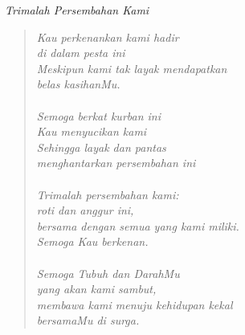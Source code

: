\small
\begin{center}
	\itshape{Trimalah Persembahan Kami}
\end{center}
\begin{verse}
	\itshape{
Kau perkenankan kami hadir\\
di dalam pesta ini\\
Meskipun kami tak layak mendapatkan\\
 belas kasihanMu.\\
{~}\\
Semoga berkat kurban ini\\
 Kau menyucikan kami\\
Sehingga layak dan pantas\\
menghantarkan persembahan ini\\
{~}\\
Trimalah persembahan kami:\\ 
roti dan anggur ini,\\
bersama dengan semua yang kami miliki.\\ 
Semoga Kau berkenan.\\ 
{~}\\
Semoga Tubuh dan DarahMu\\ 
yang akan kami sambut,\\ 
membawa kami menuju kehidupan kekal\\ 
bersamaMu di surga. 
}
\end{verse}
\normalsize